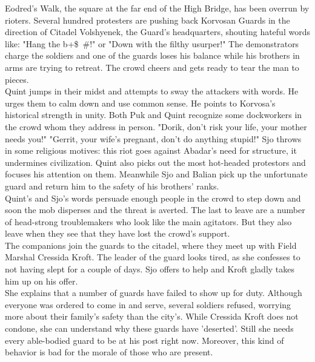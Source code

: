Eodred's Walk, the square at the far end of the High Bridge, has been overrun by rioters. Several hundred protesters are pushing back Korvosan Guards in the direction of Citadel Volshyenek, the Guard's headquarters, shouting hateful words like: "Hang the b+\$~\#!" or "Down with the filthy usurper!" The demonstrators charge the soldiers and one of the guards loses his balance while his brothers in arms are trying to retreat. The crowd cheers and gets ready to tear the man to pieces.\\

Quint jumps in their midst and attempts to sway the attackers with words. He urges them to calm down and use common sense. He points to Korvosa's historical strength in unity. Both Puk and Quint recognize some dockworkers in the crowd whom they address in person. "Dorik, don't risk your life, your mother needs you!" "Gerrit, your wife's pregnant, don't do anything stupid!" Sjo throws in some religious motives: this riot goes against Abadar's need for structure, it undermines civilization. Quint also picks out the most hot-headed protestors and focuses his attention on them. Meanwhile Sjo and Balian pick up the unfortunate guard and return him to the safety of his brothers' ranks.\\

Quint's and Sjo's words persuade enough people in the crowd to step down and soon the mob disperses and the threat is averted. The last to leave are a number of head-strong troublemakers who look like the main agitators. But they also leave when they see that they have lost the crowd's support.\\

The companions join the guards to the citadel, where they meet up with Field Marshal Cressida Kroft. The leader of the guard looks tired, as she confesses to not having slept for a couple of days. Sjo offers to help and Kroft gladly takes him up on his offer.\\

She explains that a number of guards have failed to show up for duty. Although everyone was ordered to come in and serve, several soldiers refused, worrying more about their family's safety than the city's. While Cressida Kroft does not condone, she can understand why these guards have 'deserted'. Still she needs every able-bodied guard to be at his post right now. Moreover, this kind of behavior is bad for the morale of those who are present.\\

